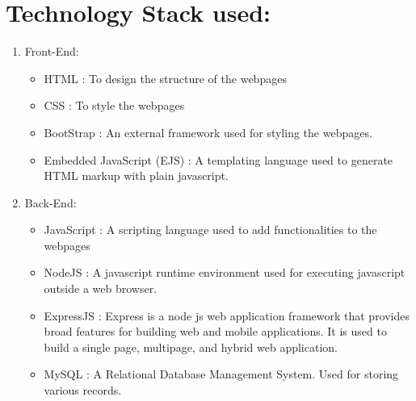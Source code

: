 \documentclass{article}
\begin{document}
\begin{itemize}
\end{itemize}


\newpage
\section*{\LARGE{Technology Stack used:}}
\begin{large}
\begin{enumerate}
    
    \item Front-End:
    \begin{itemize}
        \item HTML :  To design the structure of the webpages
        \item CSS : To style the webpages
        \item BootStrap : An external framework used for styling the webpages.
        \item Embedded JavaScript (EJS) : A templating language used to generate HTML markup with plain javascript.
    \end{itemize}
    
    \item Back-End:
    \begin{itemize}
        \item JavaScript : A scripting language used to 
            add functionalities to the webpages
        \item NodeJS : A javascript runtime environment used for executing javascript outside a web browser.
        \item ExpressJS :  Express is a node js web application framework that provides broad features for building web and mobile applications.
         It is used to build a single page, multipage, and hybrid web application. 
        \item MySQL : A Relational Database Management System. Used for storing various records. 
    \end{itemize}
\end{enumerate}
\end{large}
\end{document}
